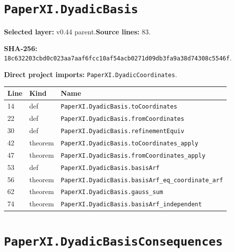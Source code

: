 \documentclass[10pt,oneside]{book}
\begin{document}
\section{\texorpdfstring{\nolinkurl{PaperXI.DyadicBasis}}{PaperXI.DyadicBasis}}\label{module:PaperXI.DyadicBasis}

\textbf{Selected layer:} v0.44 parent.\quad\textbf{Source lines:} 83.\par\textbf{SHA-256:} {\scriptsize\nolinkurl{18c632203cbd0c023aa7aaf6fcc10af54acb0271d09db3fa9a38d74308c5546f}}.


\textbf{Direct project imports:} \nolinkurl{PaperXI.DyadicCoordinates}.

\begin{longtable}{@{}p{}p{}p{}@{}}\toprule Line&Kind&Name\\\midrule\endhead

14&def&\nolinkurl{PaperXI.DyadicBasis.toCoordinates}\\

22&def&\nolinkurl{PaperXI.DyadicBasis.fromCoordinates}\\

30&def&\nolinkurl{PaperXI.DyadicBasis.refinementEquiv}\\

42&theorem&\nolinkurl{PaperXI.DyadicBasis.toCoordinates_apply}\\

47&theorem&\nolinkurl{PaperXI.DyadicBasis.fromCoordinates_apply}\\

53&def&\nolinkurl{PaperXI.DyadicBasis.basisArf}\\

56&theorem&\nolinkurl{PaperXI.DyadicBasis.basisArf_eq_coordinate_arf}\\

62&theorem&\nolinkurl{PaperXI.DyadicBasis.gauss_sum}\\

74&theorem&\nolinkurl{PaperXI.DyadicBasis.basisArf_independent}\\

\bottomrule\end{longtable}

\section{\texorpdfstring{\nolinkurl{PaperXI.DyadicBasisConsequences}}{PaperXI.DyadicBasisConsequences}}\label{module:PaperXI.DyadicBasisConsequences}
\end{document}
